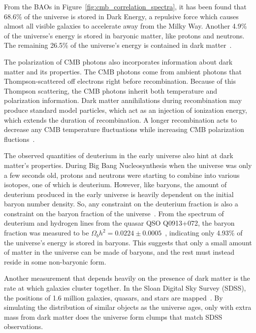 From the BAOs in Figure~\ref{fig:cmb_correlation_spectra}, it has been found that 68.6\% of the universe is stored in Dark Energy, a repulsive force which causes almost all visible galaxies to accelerate away from the Milky Way.
Another 4.9\% of the universe's energy is stored in baryonic matter, like protons and neutrons.
The remaining 26.5\% of the universe's energy is contained in dark matter~\cite{planck2015}.

The polarization of CMB photons also incorporates information about dark matter and its properties.
The CMB photons come from ambient photons that Thompson-scattered off electrons right before recombination.
Because of this Thompson scattering, the CMB photons inherit both temperature and polarization information.
Dark matter annihilations during recombination may produce standard model particles, which act as an injection of ionization energy, which extends the duration of recombination.
A longer recombination acts to decrease any CMB temperature fluctuations while increasing CMB polarization fluctions~\cite{cmb_polarization1,cmb_polarization2}.

The observed quantities of deuterium in the early universe also hint at dark matter's properties.
During Big Bang Nucleosynthesis when the universe was only a few seconds old, protons and neutrons were starting to combine into various isotopes, one of which is deuterium.
However, like baryons, the amount of deuterium produced in the early universe is heavily dependent on the initial baryon number density.
So, any constraint on the deuterium fraction is also a constraint on the baryon fraction of the universe~\cite{deuterium1,deuterium2}.
From the spectrum of deuterium and hydrogen lines from the quasar QSO Q0913+072, the baryon fraction was measured to be $\Omega_{b}h^2 = 0.0224 \pm 0.0005$~\cite{deuterium3}, indicating only 4.93\% of the universe's energy is stored in baryons.
This suggests that only a small amount of matter in the universe can be made of baryons, and the rest must instead reside in some non-baryonic form.

Another measurement that depends heavily on the presence of dark matter is the rate at which galaxies cluster together.
In the Sloan Digital Sky Survey (SDSS), the positions of 1.6 million galaxies, quasars, and stars are mapped~\cite{sdss_release}.
By simulating the distribution of similar objects as the universe ages, only with extra mass from dark matter does the universe form clumps that match SDSS observations.



